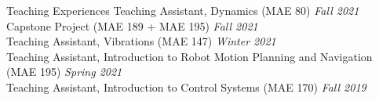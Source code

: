 \begin{rSection}{Teaching Experiences}
{Teaching Assistant, Dynamics (MAE 80)} \hfill {\em Fall 2021}\\
{Capstone Project (MAE 189 + MAE 195)} \hfill {\em Fall 2021}\\
{Teaching Assistant, Vibrations (MAE 147)} \hfill {\em Winter 2021}\\
{Teaching Assistant, Introduction to Robot Motion Planning and Navigation (MAE 195)} \hfill {\em Spring 2021}\\
{Teaching Assistant, Introduction to Control Systems (MAE 170)} \hfill {\em Fall 2019}
\end{rSection}